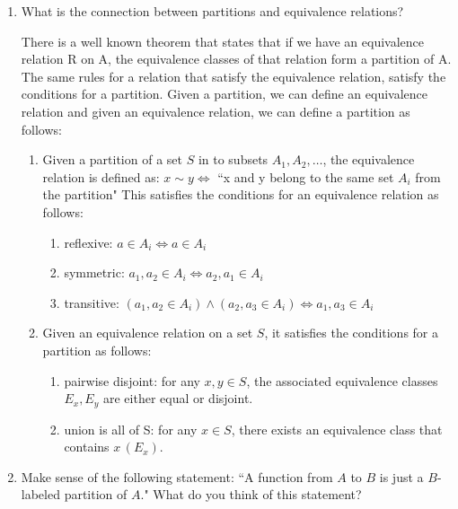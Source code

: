 \documentclass{article}
\begin{document}
\begin{enumerate}
\item What is the connection between partitions and equivalence relations?
\begin{flushleft}
There is a well known theorem that states that if we have an equivalence relation R on A, the equivalence classes of that relation form a partition of A. The same rules for a relation that satisfy the equivalence relation, satisfy the conditions for a partition. Given a partition, we can define an equivalence relation and given an equivalence relation, we can define a partition as follows:
\begin{enumerate}
    \item Given a partition of a set $S$ in to subsets $A_1, A_2, \ldots$, the equivalence relation is defined as: $x \sim y \Leftrightarrow$ ``x and y belong to the same set $A_i$ from the partition" This satisfies the conditions for an equivalence relation as follows:
    \begin{enumerate}
        \item reflexive: $a \in A_i \Leftrightarrow a \in A_i$
        \item symmetric: $a_1,a_2 \in A_i \Leftrightarrow a_2,a_1 \in A_i$
        \item transitive: $(a_1,a_2 \in A_i) \wedge (a_2,a_3 \in A_i) \Leftrightarrow a_1,a_3 \in A_i$
    \end{enumerate}
    \item Given an equivalence relation on a set $S$, it satisfies the conditions for a partition as follows:
    \begin{enumerate}
        \item pairwise disjoint: for any $x,y \in S$, the associated equivalence classes $E_x, E_y$ are either equal or disjoint.
        \item union is all of S: for any $x \in S$, there exists an equivalence class that contains $x \, (E_x)$.
    \end{enumerate}
\end{enumerate}
\end{flushleft}

\item  Make sense of the following statement: ``A function from $A$ to $B$ is just a $B$-labeled partition of $A$." What do you think of this statement?


\end{enumerate}
\end{document}
